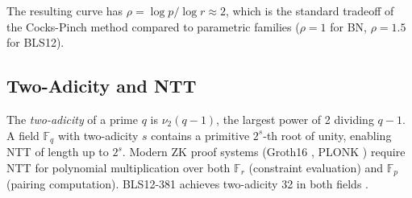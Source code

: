 The resulting curve has \(\rho = \log p / \log r \approx 2\), which is
the standard tradeoff of the Cocks-Pinch method compared to parametric
families (\(\rho = 1\) for BN, \(\rho = 1.5\) for BLS12).

\subsection{Two-Adicity and NTT}\label{two-adicity-and-ntt}

The \emph{two-adicity} of a prime \(q\) is \(\nu_2(q-1)\), the largest
power of 2 dividing \(q-1\). A field \(\mathbb{F}_q\) with two-adicity
\(s\) contains a primitive \(2^s\)-th root of unity, enabling NTT of
length up to \(2^s\). Modern ZK proof systems (Groth16
\cite{Groth2016}, PLONK \cite{PLONK2019}) require NTT for polynomial
multiplication over both \(\mathbb{F}_r\) (constraint evaluation) and
\(\mathbb{F}_p\) (pairing computation). BLS12-381 achieves two-adicity
32 in both fields \cite{BLS12_381}.
